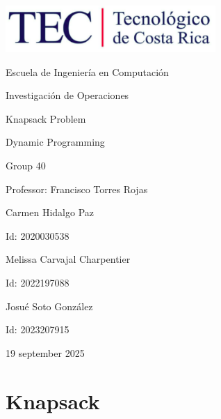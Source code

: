 \documentclass{article}
\begin{document}
\begin{titlepage}
    \centering
    \includegraphics[width=0.6\textwidth]{logo-tec.png}\par\vspace{1cm}

    {\large Escuela de Ingeniería en Computación\par}
    {\large Investigación de Operaciones\par}
    \vspace{2cm}

    {\Large Knapsack Problem\par}
    {\large Dynamic Programming\par}
    \vspace{2cm}

    {\large Group 40\par}
    {\large Professor: Francisco Torres Rojas\par}
    \vspace{3cm}

    {\large Carmen Hidalgo Paz\par}
    {\large Id: 2020030538\par}
    \vspace{1cm}
    {\large Melissa Carvajal Charpentier\par}
    {\large Id: 2022197088\par}
    \vspace{1cm}
    {\large Josué Soto González\par}
    {\large Id: 2023207915\par}
    \vspace{1cm}

    {\large 19 september 2025\par}
\end{titlepage}

\newpage


\section{Knapsack}
\end{document}
